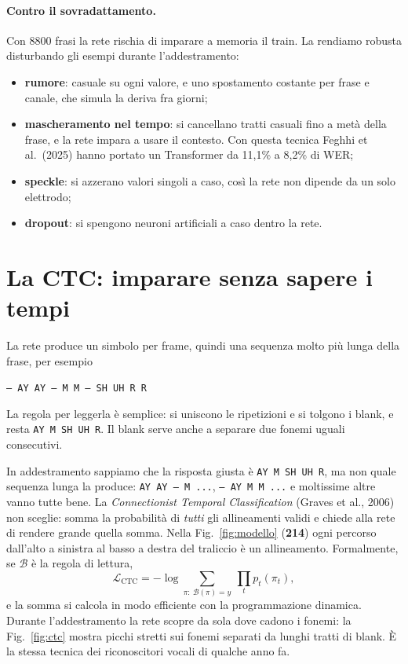 \documentclass[10pt,a4paper]{article}
\begin{document}
\paragraph{Contro il sovradattamento.} Con 8800 frasi la rete rischia di imparare a memoria il train. La rendiamo robusta disturbando gli esempi durante l'addestramento:
\begin{itemize}\setlength\itemsep{0pt}
\item \textbf{rumore}: casuale su ogni valore, e uno spostamento costante per frase e canale, che simula la deriva fra giorni;
\item \textbf{mascheramento nel tempo}: si cancellano tratti casuali fino a metà della frase, e la rete impara a usare il contesto. Con questa tecnica Feghhi et al.\ (2025) hanno portato un Transformer da 11{,}1\% a 8{,}2\% di WER;
\item \textbf{speckle}: si azzerano valori singoli a caso, così la rete non dipende da un solo elettrodo;
\item \textbf{dropout}: si spengono neuroni artificiali a caso dentro la rete.
\end{itemize}

\section{La CTC: imparare senza sapere i tempi}
\label{sec:ctc}

La rete produce un simbolo per frame, quindi una sequenza molto più lunga della frase, per esempio
\begin{center}\small\texttt{-- AY AY -- M M -- SH UH R R}\end{center}
La regola per leggerla è semplice: si uniscono le ripetizioni e si tolgono i blank, e resta \texttt{AY M SH UH R}. Il blank serve anche a separare due fonemi uguali consecutivi.

In addestramento sappiamo che la risposta giusta è \texttt{AY M SH UH R}, ma non quale sequenza lunga la produce: \texttt{AY AY -- M ...}, \texttt{-- AY M M ...} e moltissime altre vanno tutte bene. La \emph{Connectionist Temporal Classification} (Graves et al., 2006) non sceglie: somma la probabilità di \emph{tutti} gli allineamenti validi e chiede alla rete di rendere grande quella somma. Nella Fig.~\ref{fig:modello} (\textbf{214}) ogni percorso dall'alto a sinistra al basso a destra del traliccio è un allineamento. Formalmente, se $\mathcal{B}$ è la regola di lettura,
\begin{equation}
\mathcal{L}_{\text{CTC}} = -\log \sum_{\pi:\ \mathcal{B}(\pi)=y}\ \prod_{t} p_t(\pi_t),
\end{equation}
e la somma si calcola in modo efficiente con la programmazione dinamica. Durante l'addestramento la rete scopre da sola dove cadono i fonemi: la Fig.~\ref{fig:ctc} mostra picchi stretti sui fonemi separati da lunghi tratti di blank. È la stessa tecnica dei riconoscitori vocali di qualche anno fa.
\end{document}
